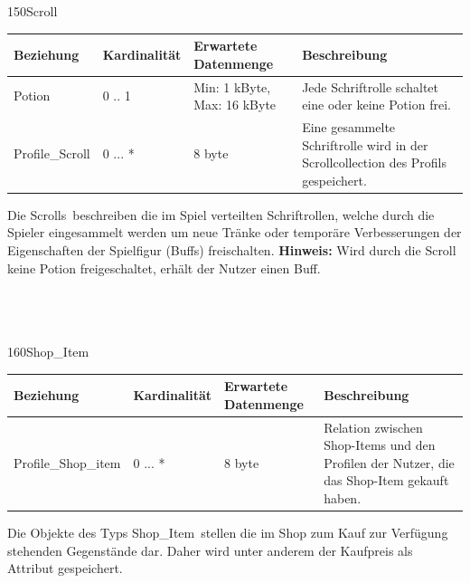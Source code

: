 \newpage
\begin{entity}{150}{Scroll}
\begin{center}
	\begin{longtable}{|m{4cm}|m{}|m{}|m{}|}
 	 \hline
 	 \textbf{Beziehung} & \textbf{Kardinalität} &  \textbf{Erwartete Datenmenge} & \textbf{Beschreibung} \\
  	\hline
  	Potion & 0 .. 1  & Min: 1 kByte, Max: 16 kByte & Jede Schriftrolle schaltet eine oder keine Potion frei.\\
	  \hline
	Profile\_Scroll & 0 ... * & 8 byte & Eine gesammelte Schriftrolle wird in der Scrollcollection des Profils gespeichert.\\
	  \hline
	\end{longtable}
\end{center}
Die \glqq Scrolls\grqq~beschreiben die im Spiel verteilten Schriftrollen, welche durch die Spieler eingesammelt werden um neue Tränke oder temporäre Verbesserungen der Eigenschaften der Spielfigur (Buffs) freischalten. 
\textbf{Hinweis:} Wird durch die Scroll keine Potion freigeschaltet, erhält der Nutzer einen Buff. \\\\\\\
\end{entity}

\begin{entity}{160}{Shop\_Item}
\begin{center}
	\begin{longtable}{|m{4cm}|m{}|m{}|m{}|}
 	 \hline
 	 \textbf{Beziehung} & \textbf{Kardinalität} &  \textbf{Erwartete Datenmenge} & \textbf{Beschreibung} \\
  	\hline
  	Profile\_Shop\_item & 0 ... *  & 8 byte & Relation zwischen Shop-Items und den Profilen der Nutzer, die das Shop-Item gekauft haben.\\
	  \hline
	\end{longtable}
\end{center}
Die Objekte des Typs \glqq Shop\_Item\grqq~stellen die im Shop zum Kauf zur Verfügung stehenden Gegenstände dar. Daher wird unter anderem der Kaufpreis als Attribut gespeichert.
\end{entity}

